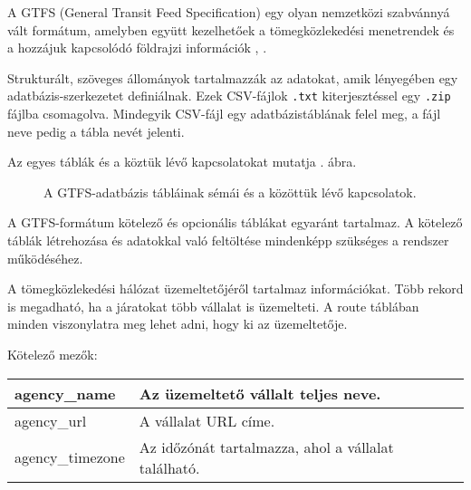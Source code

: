 
A GTFS (General Transit Feed Specification) egy olyan nemzetközi szabvánnyá vált formátum, amelyben együtt kezelhetőek a tömegközlekedési menetrendek és a hozzájuk kapcsolódó földrajzi információk \cite{gtfs}, \cite{gtfsspec}.

Strukturált, szöveges állományok tartalmazzák az adatokat, amik lényegében egy adatbázis-szerkezetet definiálnak. Ezek CSV-fájlok \texttt{.txt} kiterjesztéssel egy \texttt{.zip} fájlba csomagolva. Mindegyik CSV-fájl egy adatbázistáblának felel meg, a fájl neve pedig a tábla nevét jelenti.

Az egyes táblák és a köztük lévő kapcsolatokat mutatja . ábra.


\begin{figure}
\centering

\caption{A GTFS-adatbázis tábláinak sémái és a közöttük lévő kapcsolatok.}
\label{fig:gtfs}
\end{figure}

A GTFS-formátum kötelező és opcionális táblákat egyaránt tartalmaz. A kötelező táblák létrehozása és adatokkal való feltöltése mindenképp szükséges a rendszer működéséhez.



A tömegközlekedési hálózat üzemeltetőjéről tartalmaz információkat. Több rekord is megadható, ha a járatokat több vállalat is üzemelteti. A route táblában minden viszonylatra meg lehet adni, hogy ki az üzemeltetője.

\medskip

\noindent Kötelező mezők:

\bigskip

\begin{tabular}{|p{3.5cm}|p{10cm}|}
\hline
agency\_name & Az üzemeltető vállalt teljes neve. \\
\hline
agency\_url & A vállalat URL címe. \\
\hline
agency\_timezone & Az időzónát tartalmazza, ahol a vállalat található. \\
\hline
\end{tabular}

